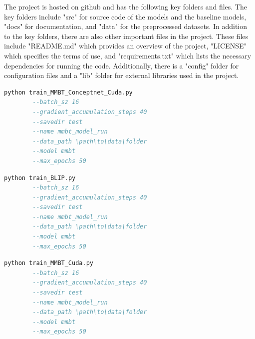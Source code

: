 The project is hosted on github and has the following key folders and files. The key folders include "src" for source code of the models and the baseline models, "docs" for documentation, and "data" for the preprocessed datasets. In addition to the key folders, there are also other important files in the project. These files include "README.md" which provides an overview of the project, "LICENSE" which specifies the terms of use, and "requirements.txt" which lists the necessary dependencies for running the code.  Additionally, there is a "config" folder for configuration files and a "lib" folder for external libraries used in the project. 

\begin{listing}[htb]%
\caption{To run the knowledge embedding model {\tt train\_MMBT\_conceptnet\_cuda.py}}%
\label{lst:listing}%
\begin{lstlisting}[language=Haskell]
python train_MMBT_Conceptnet_Cuda.py    
        --batch_sz 16  
        --gradient_accumulation_steps 40 
        --savedir test 
        --name mmbt_model_run 
        --data_path \path\to\data\folder
        --model mmbt 
        --max_epochs 50
\end{lstlisting}
\end{listing}


\begin{listing}[htb]%
\caption{To run the BLIP model {\tt train\_BLIP.py}}%
\label{lst:listing}%
\begin{lstlisting}[language=Haskell]
python train_BLIP.py    
        --batch_sz 16  
        --gradient_accumulation_steps 40 
        --savedir test 
        --name mmbt_model_run 
        --data_path \path\to\data\folder
        --model mmbt 
        --max_epochs 50
\end{lstlisting}
\end{listing}

\begin{listing}[htb]%
\caption{To run the baseline MMBT model {\tt train\_MMBT\_cuda.py}}%
\label{lst:listing}%
\begin{lstlisting}[language=Haskell]
python train_MMBT_Cuda.py    
        --batch_sz 16  
        --gradient_accumulation_steps 40 
        --savedir test 
        --name mmbt_model_run 
        --data_path \path\to\data\folder
        --model mmbt 
        --max_epochs 50
\end{lstlisting}
\end{listing}



